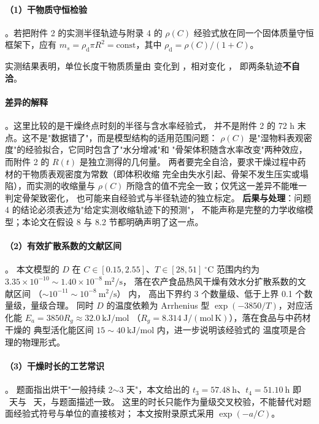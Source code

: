 \paragraph{（1）干物质守恒检验}。若把附件 2 的实测半径轨迹与附录 4 的
$\rho(C)$ 经验式放在同一个固体质量守恒框架下，应有
$m_s=\rho_{\mathrm{d}}\pi R^2=\text{const}$，其中
$\rho_{\mathrm{d}}=\rho(C)/(1+C)$。

实测结果表明，单位长度干物质质量由  变化到
，相对变化 ，
即两条轨迹\textbf{不自洽}。

\paragraph{差异的解释}。这里比较的是干燥终点时刻的半径与含水率经验式，
并不是附件 2 的 72 h 末点。这不是"数据错了"，而是模型结构的适用范围问题：
$\rho(C)$ 是"湿物料表观密度"的经验拟合，它同时包含了"水分增减"和
"骨架体积随含水率改变"两种效应，而附件 2 的 $R(t)$ 是独立测得的几何量。
两者要完全自洽，要求干燥过程中药材的干物质表观密度为常数（即体积收缩
完全由失水引起、骨架不发生压实或塌陷），而实测的收缩量与
$\rho(C)$ 所隐含的值不完全一致；仅凭这一差异不能唯一判定骨架致密化，
也可能来自经验式与半径轨迹的独立标定。
\textbf{后果与处理}：问题 4 的结论必须表述为"给定实测收缩轨迹下的预测"，
不能声称是完整的力学收缩模型；本论文在假设 8 与 8.2 节都明确声明了这一点。

\paragraph{（2）有效扩散系数的文献区间}。
本文模型的 $D$ 在 $C\in[0.15,2.55]$、$T\in[28,51]\ ^\circ\mathrm{C}$
范围内约为 $3.35\times10^{-10}\sim1.40\times10^{-8}\ \mathrm{m^2/s}$，
落在农产食品热风干燥有效水分扩散系数的文献区间
（$\sim10^{-11}\sim10^{-8}\ \mathrm{m^2/s}$）\cite{zogzas,srikiatden} 内，
高出下界约 3 个数量级、低于上界 0.1 个数量级，量级合理。
同时 $D$ 的温度依赖为 Arrhenius 型
$\exp(-3850/T)$，对应活化能 $E_a=3850R_g\approx32.0\ \mathrm{kJ/mol}$
（$R_g=8.314\ \mathrm{J/(mol\,K)}$），落在食品与中药材干燥的
典型活化能区间 $15\sim40\ \mathrm{kJ/mol}$ 内，进一步说明该经验式的
温度项是合理的物理形式。

\paragraph{（3）干燥时长的工艺常识}。
题面指出烘干"一般持续 2$\sim$3 天"，本文给出的
$t_3=\text{57.48}\ \mathrm{h}$、$t_4=\text{51.10}\ \mathrm{h}$
即 \ 天与 \ 天，与题面描述一致。
这里的时长只能作为量级交叉校验，不能替代对题面经验式符号与单位的直接核对；
本文按附录原式采用 $\exp(-a/C)$。

